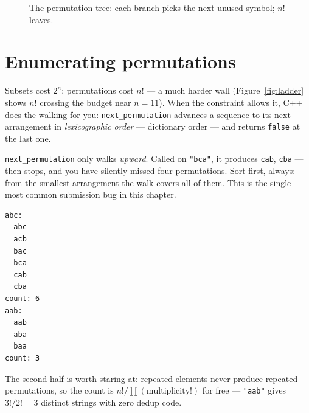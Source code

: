 \begin{figure}[htbp]\centering

\caption{The permutation tree: each branch picks the next unused symbol; $n!$ leaves.}
\label{fig:permtree}
\end{figure}

\section{Enumerating permutations}\label{sec:perms}

Subsets cost $2^n$; permutations cost $n!$ --- a much harder wall
(Figure~\ref{fig:ladder} shows $n!$ crossing the budget near $n = 11$). When
the constraint allows it, C++ does the walking for you:
\texttt{next\_permutation}
advances a sequence to its next arrangement in
\emph{lexicographic order} --- dictionary order ---
and returns \texttt{false} at the last one.

\begin{tripwire}
\texttt{next\_permutation} only walks \emph{upward}. Called on
\texttt{"bca"}, it produces \texttt{cab}, \texttt{cba} --- then stops, and you
have silently missed four permutations. Sort first, always: from the smallest
arrangement the walk covers all of them. This is the single most common
submission bug in this chapter.
\end{tripwire}



\begin{lstlisting}[numbers=none]
abc:
  abc
  acb
  bac
  bca
  cab
  cba
count: 6
aab:
  aab
  aba
  baa
count: 3
\end{lstlisting}

The second half is worth staring at: repeated elements never produce repeated
permutations, so the count is $n!/\prod(\text{multiplicity}!)$ for free ---
\texttt{"aab"} gives $3!/2! = 3$ distinct strings with zero dedup code.


